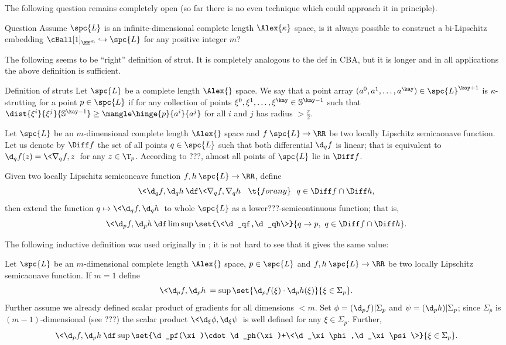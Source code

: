 The following question remains completely open (so far there is no even technique which could approach it in principle).

\begin{thm}{Question}
Assume $\spc{L}$ is an infinite-dimensional complete length $\Alex{\kappa}$ space, 
is it always possible to construct a bi-Lipschitz embedding $\cBall[1]_{\EE^m}\hookrightarrow \spc{L}$ for any positive integer $m$?
\end{thm}

The following seems to be ``right'' definition of strut.
It is completely analogous to the def in CBA,
but it is  longer and in all applications the above definition is sufficient.%

\begin{thm}{Definition of struts}\label{def:strut-I+}
Let $\spc{L}$ be a complete length $\Alex{}$ space.
We say that a point array $(a^0,a^1,\dots,a^\kay)\in\spc{L}^{\kay+1}$
is $\kappa$-strutting for a point $p\in\spc{L}$ if 
for any collection of points $\xi^0,\xi^1,\dots,\xi^\kay\in \mathbb{S}^{\kay-1}$
such that $\dist{\xi^i}{\xi^j}{\mathbb{S}^{\kay-1}}\ge \mangle\hinge{p}{a^i}{a^j}$ for all $i$ and $j$ 
has radius $>\tfrac\pi2$.
\end{thm} 

Let 
$\spc{L}$ be an $m$-dimensional complete length $\Alex{}$ space
and $f\:\spc{L}\to \RR$ be two locally Lipschitz semicaonave function.
Let us denote by $\Diff f$ the set of all points $q\in\spc{L}$ such that
both differential $\d_qf$ is linear;
that is equivalent to $\d_qf(z)=\<\nabla_qf,z\>$ for any $z\in\T_p$.
According to ???, almost all points of $\spc{L}$ lie in $\Diff f$.

Given two locally Lipschitz semiconcave function $f,h\:\spc{L}\to \RR$,
define 
\[
\<\d_qf,\d_qh\>
\df
\<\nabla_qf,\nabla_q h\>
\ \ \t{for any}\ \ 
q\in \Diff f\cap\Diff h,\]
then extend the function $q\mapsto \<\d_qf,\d_qh\>$ to whole $\spc{L}$ as a lower???-semicontinuous function;
that is,
\[
\<\d_pf,\d_ph\>
\df
\limsup\set{\<\d_qf,\d_qh\>}{q\to p,\ q\in \Diff f\cap \Diff h}.
\]

The following inductive definition was used originally in \cite[???]{perelman:DC}; 
it is not hard to see that it gives the same value:

Let $\spc{L}$ be an $m$-dimensional complete length $\Alex{}$ space, 
$p\in\spc{L}$ 
and $f,h\:\spc{L}\to \RR$ be two locally Lipschitz semicaonave function.
If $m=1$ define 
\[
\<\d_p f,\d_ph\>
=
\sup\set{\d_pf(\xi)\cdot\d_ph(\xi)}{\xi\in\Sigma_p}.
\]
Further assume we already defined scalar product of gradients for all dimensions $<m$.
Set $\phi=(\d_pf)|\Sigma_p$ and $\psi=(\d_ph)|\Sigma_p$;
since $\Sigma_p$ is $(m-1)$-dimensional (see ???) the scalar product
$\<\d_\xi\phi,\d_\xi\psi\>$ is well defined for any $\xi\in\Sigma_p$.
Further, 
\[
\<\d_pf,\d_ph\>
\df
\sup
\set{\d_pf(\xi)\cdot\d_ph(\xi)+\<\d_\xi\phi,\d_\xi\psi\>}%
{\xi\in\Sigma_p}.
\]


